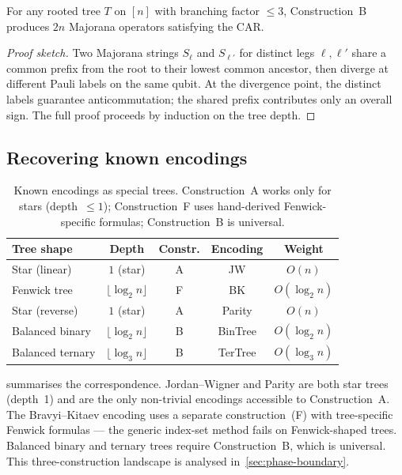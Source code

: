 \begin{proposition}
\label{prop:pathbased-car}
For any rooted tree $T$ on $[n]$ with branching factor $\le 3$,
Construction~B produces $2n$ Majorana operators satisfying the CAR.
\end{proposition}

\begin{proof}[Proof sketch]
Two Majorana strings $S_\ell$ and $S_{\ell'}$ for distinct legs
$\ell, \ell'$ share a common prefix from the root to their lowest
common ancestor, then diverge at different Pauli labels on the same
qubit.  At the divergence point, the distinct labels guarantee
anticommutation; the shared prefix contributes only an overall sign.
The full proof proceeds by induction on the tree depth.
\end{proof}

\subsection{Recovering known encodings}
\label{sec:te-recovery}

\begin{table}[t]
\centering
\caption{Known encodings as special trees.  Construction~A works only
for stars (depth~$\le 1$); Construction~F uses hand-derived
Fenwick-specific formulas; Construction~B is universal.}
\label{tab:encodings-as-trees}
\begin{tabular}{@{}lcccc@{}}
\toprule
\textbf{Tree shape} & \textbf{Depth} & \textbf{Constr.} &
  \textbf{Encoding} & \textbf{Weight} \\
\midrule
Star (linear)       & $1$ (star)           & A      & JW      & $O(n)$ \\
Fenwick tree        & $\lfloor\log_2 n\rfloor$ & F      & BK      & $O(\log_2 n)$ \\
Star (reverse)      & $1$ (star)           & A      & Parity  & $O(n)$ \\
Balanced binary     & $\lfloor\log_2 n\rfloor$ & B      & BinTree & $O(\log_2 n)$ \\
Balanced ternary    & $\lfloor\log_3 n\rfloor$ & B      & TerTree & $O(\log_3 n)$ \\
\bottomrule
\end{tabular}
\end{table}

 summarises the correspondence.
Jordan--Wigner and Parity are both star trees (depth~1) and are the
only non-trivial encodings accessible to Construction~A.  The
Bravyi--Kitaev encoding uses a separate construction~(F) with
tree-specific Fenwick formulas --- the generic index-set method fails
on Fenwick-shaped trees.  Balanced binary and ternary trees require
Construction~B, which is universal.  This three-construction landscape
is analysed in~\cref{sec:phase-boundary}.
